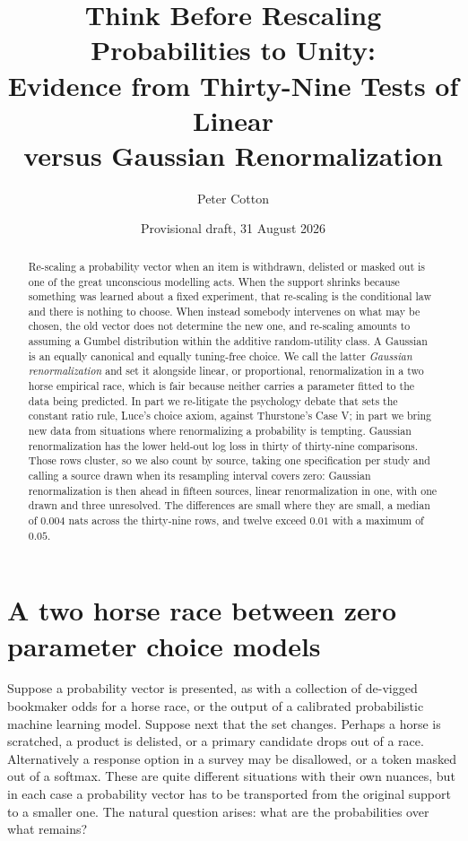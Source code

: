 \documentclass[11pt]{article}
\title{\textbf{Think Before Rescaling Probabilities to Unity:\\Evidence from Thirty-Nine Tests of Linear\\versus Gaussian Renormalization}}
\author{Peter Cotton}
\date{Provisional draft, 31 August 2026}
\begin{document}
\maketitle

\begin{abstract}
\noindent Re-scaling a probability vector when an item is withdrawn, delisted or masked out is
one of the great unconscious modelling acts. When the support shrinks because something was
learned about a fixed experiment, that re-scaling is the conditional law and there is nothing to
choose. When instead somebody intervenes on what may be chosen, the old vector does not determine
the new one, and re-scaling amounts to assuming a Gumbel distribution within the additive
random-utility class\footnotemark[6]. A Gaussian is an equally canonical and equally tuning-free
choice. We call the latter \emph{Gaussian renormalization} and set it alongside linear, or
proportional, renormalization in a two horse empirical race, which is fair because neither carries
a parameter fitted to the data being predicted. In part we re-litigate the psychology debate that
sets the constant ratio rule, Luce's choice axiom, against Thurstone's Case V; in part we bring
new data from situations where renormalizing a probability is tempting. Gaussian renormalization
has the lower held-out log loss in thirty of thirty-nine comparisons. Those rows cluster, so we
also count by source, taking one specification per study and calling a source drawn when its
resampling interval covers zero: Gaussian renormalization is then ahead in fifteen sources,
linear renormalization in one, with one drawn and three unresolved. The differences are small where
they are small, a median of $0.004$ nats across the thirty-nine rows, and twelve exceed $0.01$
with a maximum of $0.05$.
\end{abstract}


\section{A two horse race between zero parameter choice models}
\label{sec:problem}

Suppose a probability vector is presented, as with a collection of de-vigged bookmaker odds for a
horse race, or the output of a calibrated probabilistic machine learning model. Suppose next that
the set changes. Perhaps a horse is scratched, a product is delisted, or a primary candidate
drops out of a race. Alternatively a response option in a survey may be disallowed, or a token
masked out of a softmax. These are quite different situations with their own nuances, but in each
case a probability vector has to be transported from the original support to a smaller one. The
natural question arises: what are the probabilities over what remains?
\end{document}
